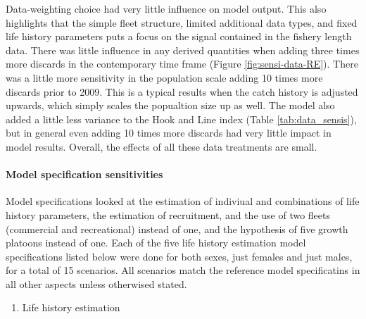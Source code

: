 \documentclass[11pt,
  english,
  a4paper,
]{article}
\begin{document}
Data-weighting choice had very little influence on model output. This also highlights that the simple fleet structure, limited additional data types, and fixed life history parameters puts a focus on the signal contained in the fishery length data. There was little influence in any derived quantities when adding three times more discards in the contemporary time frame (Figure \ref{fig:sensi-data-RE}). There was a little more sensitivity in the population scale adding 10 times more discards prior to 2009. This is a typical results when the catch history is adjusted upwards, which simply scales the popualtion size up as well. The model also added a little less variance to the Hook and Line index (Table \ref{tab:data_sensis}), but in general even adding 10 times more discards had very little impact in model results. Overall, the effects of all these data treatments are small.

\leavevmode\tagmcend\tagstructend\par


\hypertarget{model-specification-sensitivities}{%
\paragraph{Model specification sensitivities}\label{model-specification-sensitivities}}

\leavevmode\tagmcend\tagstructend


Model specifications looked at the estimation of indiviual and combinations of life history parameters, the estimation of recruitment, and the use of two fleets (commercial and recreational) instead of one, and the hypothesis of five growth platoons instead of one. Each of the five life history estimation model specifications listed below were done for both sexes, just females and just males, for a total of 15 scenarios. All scenarios match the reference model specificatins in all other aspects unless otherwised stated.

\leavevmode\tagmcend\tagstructend\par


\begin{enumerate}
\def\labelenumi{\arabic{enumi}.}
\item

  Life history estimation

  \tagmcend\tagstructend\tagstructend
\end{enumerate}
\end{document}
